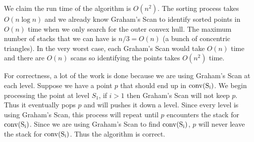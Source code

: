 \documentclass[11pt]{article}
\newcommand{\conv}[1]{\rm{conv}(#1)}
\begin{document}
We claim the run time of the algorithm is $O(n^2)$.
The sorting process takes $O(n \log n)$ and we already know Graham's Scan to identify sorted points in $O(n)$ time when we only search for the outer convex hull.
The maximum number of stacks that we can have is $n/3 = O(n)$ (a bunch of concentric triangles).
In the very worst case, each Graham's Scan would take $O(n)$ time and there are $O(n)$ scans so identifying the points takes $O(n^2)$ time.

For correctness, a lot of the work is done because we are using Graham's Scan at each level.
Suppose we have a point $p$ that should end up in $\conv{S_i}$.
We begin processing the point at level $S_1$, if $i > 1$ then Graham's Scan will not keep $p$.
Thus it eventually pops $p$ and will pushes it down a level.
Since every level is using Graham's Scan, this process will repeat until $p$ encounters the stack for $\conv{S_i}$.
Since we are using Graham's Scan to find $\conv{S_i}$, $p$ will never leave the stack for $\conv{S_i}$.
Thus the algorithm is correct.

%
%
%
%
\end{document}
